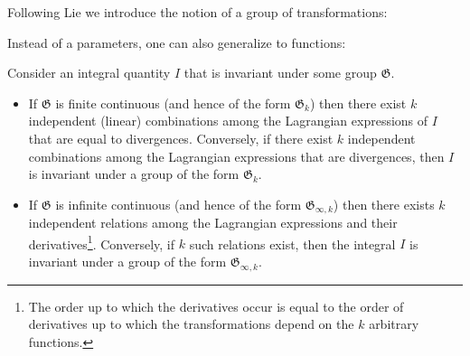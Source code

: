     Following Lie we introduce the notion of a group of transformations:

    Instead of a parameters, one can also generalize to functions:

    \begin{theorem}[Noether]
        Consider an integral quantity $I$ that is invariant under some group $\mathfrak{G}$.
        \begin{itemize}
            \item If $\mathfrak{G}$ is finite continuous (and hence of the form $\mathfrak{G}_k$) then there exist $k$ independent (linear) combinations among the Lagrangian expressions of $I$ that are equal to divergences. Conversely, if there exist $k$ independent combinations among the Lagrangian expressions that are divergences, then $I$ is invariant under a group of the form $\mathfrak{G}_k$.
            \item If $\mathfrak{G}$ is infinite continuous (and hence of the form $\mathfrak{G}_{\infty, k}$) then there exists $k$ independent relations among the Lagrangian expressions and their derivatives\footnote{The order up to which the derivatives occur is equal to the order of derivatives up to which the transformations depend on the $k$ arbitrary functions.}. Conversely, if $k$ such relations exist, then the integral $I$ is invariant under a group of the form $\mathfrak{G}_{\infty, k}$.
        \end{itemize}
    \end{theorem}

